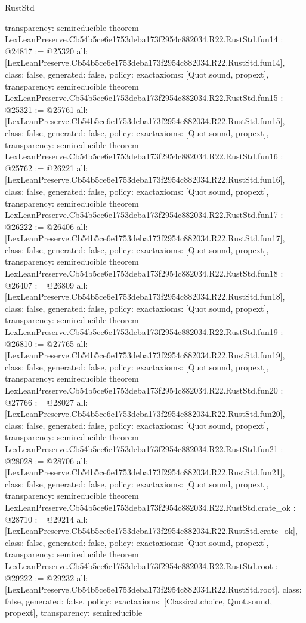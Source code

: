 \begin{lexlean}{RustStd}
\begin{coremodule}
{  transparency: semireducible
}
theorem LexLeanPreserve.Cb54b5ce6e1753deba173f2954c882034.R22.RustStd.fun14 : @24817 := @25320 {
  all: [LexLeanPreserve.Cb54b5ce6e1753deba173f2954c882034.R22.RustStd.fun14],
  class: false,
  generated: false,
  policy: exact{axioms: [Quot.sound, propext]},
  transparency: semireducible
}
theorem LexLeanPreserve.Cb54b5ce6e1753deba173f2954c882034.R22.RustStd.fun15 : @25321 := @25761 {
  all: [LexLeanPreserve.Cb54b5ce6e1753deba173f2954c882034.R22.RustStd.fun15],
  class: false,
  generated: false,
  policy: exact{axioms: [Quot.sound, propext]},
  transparency: semireducible
}
theorem LexLeanPreserve.Cb54b5ce6e1753deba173f2954c882034.R22.RustStd.fun16 : @25762 := @26221 {
  all: [LexLeanPreserve.Cb54b5ce6e1753deba173f2954c882034.R22.RustStd.fun16],
  class: false,
  generated: false,
  policy: exact{axioms: [Quot.sound, propext]},
  transparency: semireducible
}
theorem LexLeanPreserve.Cb54b5ce6e1753deba173f2954c882034.R22.RustStd.fun17 : @26222 := @26406 {
  all: [LexLeanPreserve.Cb54b5ce6e1753deba173f2954c882034.R22.RustStd.fun17],
  class: false,
  generated: false,
  policy: exact{axioms: [Quot.sound, propext]},
  transparency: semireducible
}
theorem LexLeanPreserve.Cb54b5ce6e1753deba173f2954c882034.R22.RustStd.fun18 : @26407 := @26809 {
  all: [LexLeanPreserve.Cb54b5ce6e1753deba173f2954c882034.R22.RustStd.fun18],
  class: false,
  generated: false,
  policy: exact{axioms: [Quot.sound, propext]},
  transparency: semireducible
}
theorem LexLeanPreserve.Cb54b5ce6e1753deba173f2954c882034.R22.RustStd.fun19 : @26810 := @27765 {
  all: [LexLeanPreserve.Cb54b5ce6e1753deba173f2954c882034.R22.RustStd.fun19],
  class: false,
  generated: false,
  policy: exact{axioms: [Quot.sound, propext]},
  transparency: semireducible
}
theorem LexLeanPreserve.Cb54b5ce6e1753deba173f2954c882034.R22.RustStd.fun20 : @27766 := @28027 {
  all: [LexLeanPreserve.Cb54b5ce6e1753deba173f2954c882034.R22.RustStd.fun20],
  class: false,
  generated: false,
  policy: exact{axioms: [Quot.sound, propext]},
  transparency: semireducible
}
theorem LexLeanPreserve.Cb54b5ce6e1753deba173f2954c882034.R22.RustStd.fun21 : @28028 := @28706 {
  all: [LexLeanPreserve.Cb54b5ce6e1753deba173f2954c882034.R22.RustStd.fun21],
  class: false,
  generated: false,
  policy: exact{axioms: [Quot.sound, propext]},
  transparency: semireducible
}
theorem LexLeanPreserve.Cb54b5ce6e1753deba173f2954c882034.R22.RustStd.crate_ok : @28710 := @29214 {
  all: [LexLeanPreserve.Cb54b5ce6e1753deba173f2954c882034.R22.RustStd.crate_ok],
  class: false,
  generated: false,
  policy: exact{axioms: [Quot.sound, propext]},
  transparency: semireducible
}
theorem LexLeanPreserve.Cb54b5ce6e1753deba173f2954c882034.R22.RustStd.root : @29222 := @29232 {
  all: [LexLeanPreserve.Cb54b5ce6e1753deba173f2954c882034.R22.RustStd.root],
  class: false,
  generated: false,
  policy: exact{axioms: [Classical.choice, Quot.sound, propext]},
  transparency: semireducible
}


\end{coremodule}
\end{lexlean}
